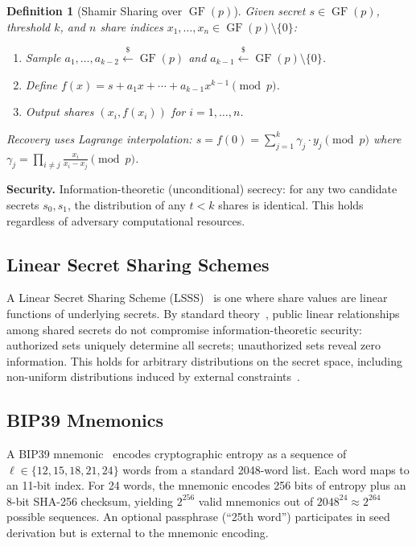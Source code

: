 \documentclass[11pt]{article}
\newcommand{\GF}{\operatorname{GF}}
\newtheorem{definition}[theorem]{Definition}
\begin{document}
\begin{definition}[Shamir Sharing over $\GF(p)$]
Given secret $s \in \GF(p)$, threshold $k$, and $n$ share indices $x_1, \ldots, x_n \in \GF(p) \setminus \{0\}$:
\begin{enumerate}[noitemsep]
    \item Sample $a_1, \ldots, a_{k-2} \xleftarrow{\$} \GF(p)$ and $a_{k-1} \xleftarrow{\$} \GF(p) \setminus \{0\}$.
    \item Define $f(x) = s + a_1 x + \cdots + a_{k-1} x^{k-1} \pmod{p}$.
    \item Output shares $(x_i, f(x_i))$ for $i = 1, \ldots, n$.
\end{enumerate}
Recovery uses Lagrange interpolation: $s = f(0) = \sum_{j=1}^{k} \gamma_j \cdot y_j \pmod{p}$ where $\gamma_j = \prod_{i \neq j} \frac{x_i}{x_i - x_j} \pmod{p}$.
\end{definition}

\textbf{Security.} Information-theoretic (unconditional) secrecy: for any two candidate secrets $s_0, s_1$, the distribution of any $t < k$ shares is identical. This holds regardless of adversary computational resources.

\subsection{Linear Secret Sharing Schemes}

A Linear Secret Sharing Scheme (LSSS)~\cite{beimel2011} is one where share values are linear functions of underlying secrets. By standard theory~\cite{cramer2000}, public linear relationships among shared secrets do not compromise information-theoretic security: authorized sets uniquely determine all secrets; unauthorized sets reveal zero information. This holds for arbitrary distributions on the secret space, including non-uniform distributions induced by external constraints~\cite{blundo1993}.

\subsection{BIP39 Mnemonics}

A BIP39 mnemonic~\cite{bip39} encodes cryptographic entropy as a sequence of $\ell \in \{12, 15, 18, 21, 24\}$ words from a standard 2048-word list. Each word maps to an 11-bit index. For 24 words, the mnemonic encodes 256 bits of entropy plus an 8-bit SHA-256 checksum, yielding $2^{256}$ valid mnemonics out of $2048^{24} \approx 2^{264}$ possible sequences. An optional passphrase (``25th word'') participates in seed derivation but is external to the mnemonic encoding.
\end{document}
